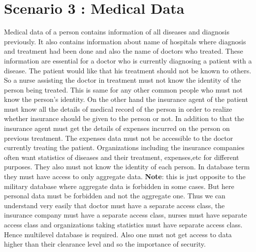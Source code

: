 \documentclass[11pt,a4paper]{report}
\begin{document}
\section{Scenario 3 : Medical Data }
Medical data of a person contains information of all diseases and diagnosis previously. It also contains information about name of hospitals where diagnosis and treatment had been done and also the name of doctors who treated. These information are essential for a doctor who is currently diagnosing a patient with a disease. The patient would like that his treatment should not be known to others. So a nurse assisting the doctor in treatment must not know the identity of the person being treated. This is same for any other common people who must not know the person's identity. On the other hand the insurance agent of the patient must know all the details of medical record of the person in order to realize whether insurance should be given to the person or not. In addition to that the insurance agent must get the details of expenses incurred on the person on previous treatment. The expenses data must not be accessible to the doctor currently treating the patient. Organizations including the insurance companies often want statistics of diseases and their treatment, expenses,etc for different purposes. They also must not know the identity of each person. In database term they must have access to only aggregate data. \textbf{Note}: this is just opposite to the military database where aggregate data is forbidden in some cases. But here personal data must be forbidden and not the aggregate one. Thus we can understand very easily that doctor must have a separate access class, the insurance company must have a separate access class, nurses must have separate access class and organizations taking statistics must have separate access class. Hence multilevel database is required. Also one must not get access to data higher than their clearance level and so the importance of security.    

\newpage
\end{document}
